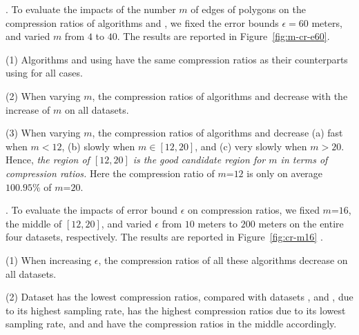 {%
.
To evaluate the impacts of the number $m$ of edges of polygons on the
compression ratios of algorithms \cist and \cista, we fixed the error bounds {$\epsilon =60$ meters}, and varied $m$ from $4$ to $40$. The results are reported in Figure~\ref{fig:m-cr-e60}.

\ni(1) Algorithms \cist and \cista using \rpia have the same compression ratios as their counterparts using \cpia for all cases.

\ni(2) When varying $m$, the compression ratios of algorithms
{\cist and \cista} decrease with the increase of $m$ on all datasets.

\ni(3) When varying $m$, the compression ratios of algorithms {\cist and \cista} decrease (a) fast when $m < 12$, (b) slowly when $m \in [12, 20]$, and (c) very slowly when $m > 20$. Hence, \emph{the region of $[12, 20]$ is the good candidate region for $m$ in terms of compression ratios.}
Here the compression ratio of $m$=$12$ is only on average {$100.95\%$} of $m$=$20$.



.
To evaluate the impacts of error bound $\epsilon$ on compression ratios, we fixed {$m$=$16$}, the middle of $[12, 20]$, and varied $\epsilon$ from $10$ meters to $200$ meters on the entire four datasets, respectively.
The results are reported in Figure~\ref{fig:cr-m16} .


\ni (1) When increasing $\epsilon$, the compression ratios of all these algorithms decrease on all datasets.

\ni (2) Dataset \pricar has the lowest compression ratios, compared with datasets \mopsi, \sercar and \geolife, due to its highest sampling rate,
\sercar has the highest compression ratios due to its lowest sampling rate, and \geolife and \mopsi have the compression ratios in the middle accordingly.

}
